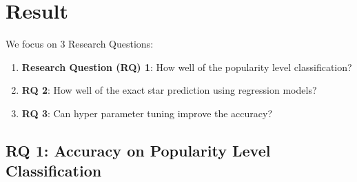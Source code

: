 \section{Result}
We focus on 3 Research Questions:
\begin{enumerate}
    \item \textbf{Research Question (RQ) 1}: How well of the popularity level classification?
     \item \textbf{RQ 2}: How well of the exact star prediction using regression models?
      \item \textbf{RQ 3}: Can hyper parameter tuning improve the accuracy?
\end{enumerate}



\subsection{RQ 1: Accuracy on Popularity Level Classification}

